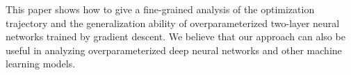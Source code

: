 
This paper shows how to give a fine-grained analysis of the optimization trajectory and the generalization ability of overparameterized two-layer neural networks trained by gradient descent. 
We believe that our approach can also be useful in analyzing overparameterized deep neural networks and other machine learning models.
